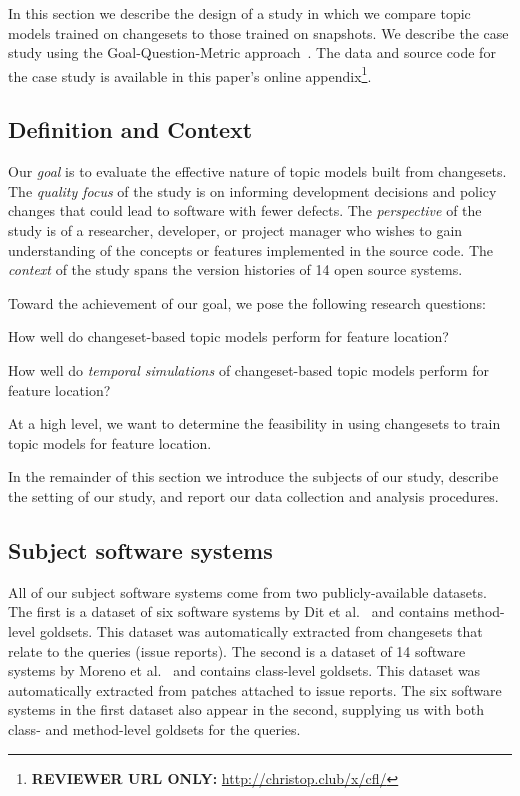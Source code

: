 
In this section we describe the design of a study in which we compare topic models trained on changesets to those trained on snapshots.
We describe the case study using the Goal-Question-Metric approach~\cite{Basili-etal:94}.
The data and source code for the case study is available in this paper's online
appendix\footnote{\textbf{REVIEWER URL ONLY:} \url{http://christop.club/x/cfl/}}.

\subsection{Definition and Context}

Our \textit{goal} is to evaluate the effective nature of topic models built
from changesets.
The \textit{quality focus} of the study is on informing development
decisions and policy changes that could lead to software with fewer
defects.
The \textit{perspective} of the study is of a researcher, developer, or
project manager who wishes to gain understanding of the concepts or
features implemented in the source code.
The \textit{context} of the study spans the version histories of 14
open source systems.

Toward the achievement of our goal, we pose the following research questions:
\begin{description}[font=\itshape\mdseries,leftmargin=10mm,style=sameline]
    \item[RQ1] How well do changeset-based topic models perform for feature location?
    \item[RQ2] How well do \emph{temporal simulations} of changeset-based topic models perform for feature location?
\end{description}
At a high level, we want to determine the feasibility in using changesets
to train topic models for feature location.

In the remainder of this section we introduce the subjects of our study,
describe the setting of our study, and report our data collection and analysis procedures.


\subsection{Subject software systems}

All of our subject software systems come from two publicly-available datasets.
The first is a dataset of six software systems by Dit et al.~\cite{Dit-etal:2013} and contains method-level goldsets.
This dataset was automatically extracted from changesets that relate to the queries (issue reports).
The second is a dataset of 14 software systems by Moreno et al.~\cite{Moreno-etal:2014} and contains class-level goldsets.
This dataset was automatically extracted from patches attached to issue reports.
The six software systems in the first dataset also appear in the second,
supplying us with both class- and method-level goldsets for the queries.

